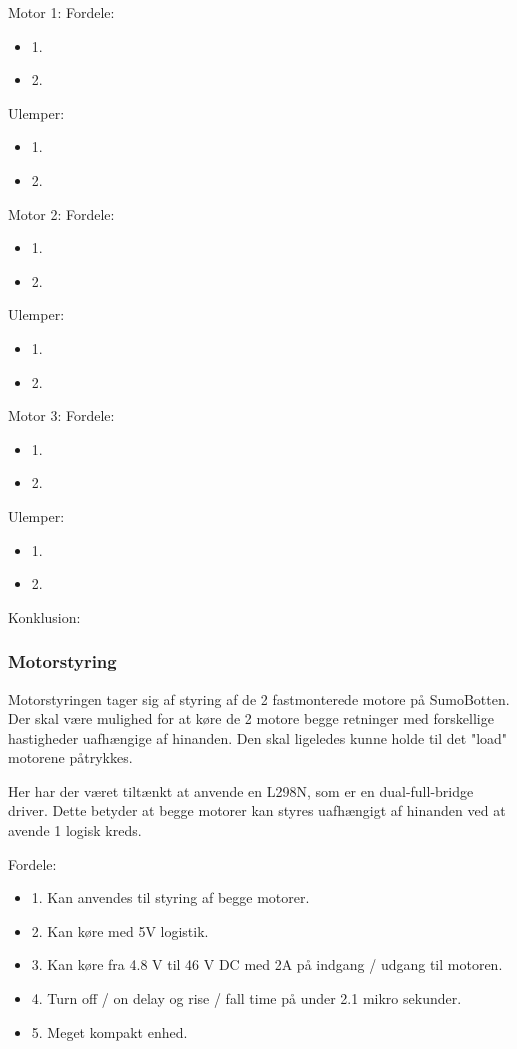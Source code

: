 Motor 1: 
Fordele:\tbr 
\begin{itemize}
\item 1.
\item 2.
\end{itemize}

Ulemper: \tbr
\begin{itemize}
\item 1.
\item 2.
\end{itemize}


Motor 2:
Fordele:\tbr 
\begin{itemize}
\item 1.
\item 2.
\end{itemize}

Ulemper: \tbr
\begin{itemize}
\item 1.
\item 2.
\end{itemize}


Motor 3:
Fordele:\tbr 
\begin{itemize}
\item 1.
\item 2.
\end{itemize}

Ulemper: \tbr
\begin{itemize}
\item 1.
\item 2.
\end{itemize}

Konklusion:


\tbr
\subsubsection*{\textbf{Motorstyring}}
Motorstyringen tager sig af styring af de 2 fastmonterede motore på SumoBotten. Der skal være mulighed for at køre de 2 motore begge retninger med forskellige hastigheder uafhængige af hinanden. Den skal ligeledes kunne holde til det "load" motorene påtrykkes.

Her har der været tiltænkt at anvende en L298N, som er en dual-full-bridge driver\cite{L298Data}. Dette betyder at begge motorer kan styres uafhængigt af hinanden ved at avende 1 logisk kreds.\tbr

Fordele: 
\begin{itemize}
\item 1. Kan anvendes til styring af begge motorer.
\item 2. Kan køre med 5V logistik.
\item 3. Kan køre fra 4.8 V til 46 V DC med 2A på indgang / udgang til motoren.
\item 4. Turn off / on delay og rise / fall time på under 2.1 mikro sekunder.
\item 5.  Meget kompakt enhed. 
\end{itemize}

